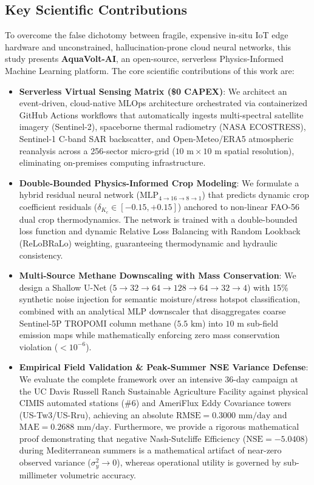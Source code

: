 \documentclass[sn-mathphys-num,Numbered]{sn-jnl}
\begin{document}
\subsection{Key Scientific Contributions}\label{sec:intro_contributions}
To overcome the false dichotomy between fragile, expensive in-situ IoT edge hardware and unconstrained, hallucination-prone cloud neural networks, this study presents \textbf{AquaVolt-AI}, an open-source, serverless Physics-Informed Machine Learning platform. The core scientific contributions of this work are:

\begin{itemize}
    \item \textbf{Serverless Virtual Sensing Matrix (\$0 CAPEX)}: We architect an event-driven, cloud-native MLOps architecture orchestrated via containerized GitHub Actions workflows that automatically ingests multi-spectral satellite imagery (Sentinel-2), spaceborne thermal radiometry (NASA ECOSTRESS), Sentinel-1 C-band SAR backscatter, and Open-Meteo/ERA5 atmospheric reanalysis across a 256-sector micro-grid ($10\text{ m} \times 10\text{ m}$ spatial resolution), eliminating on-premises computing infrastructure.
    \item \textbf{Double-Bounded Physics-Informed Crop Modeling}: We formulate a hybrid residual neural network ($\text{MLP}_{4 \to 16 \to 8 \to 1}$) that predicts dynamic crop coefficient residuals ($\delta_{K_c} \in [-0.15, +0.15]$) anchored to non-linear FAO-56 dual crop thermodynamics. The network is trained with a double-bounded loss function and dynamic Relative Loss Balancing with Random Lookback (ReLoBRaLo) weighting, guaranteeing thermodynamic and hydraulic consistency.
    \item \textbf{Multi-Source Methane Downscaling with Mass Conservation}: We design a Shallow U-Net ($5 \to 32 \to 64 \to 128 \to 64 \to 32 \to 4$) with 15\% synthetic noise injection for semantic moisture/stress hotspot classification, combined with an analytical MLP downscaler that disaggregates coarse Sentinel-5P TROPOMI column methane ($5.5\text{ km}$) into $10\text{ m}$ sub-field emission maps while mathematically enforcing zero mass conservation violation ($<10^{-6}$).
    \item \textbf{Empirical Field Validation \& Peak-Summer NSE Variance Defense}: We evaluate the complete framework over an intensive 36-day campaign at the UC Davis Russell Ranch Sustainable Agriculture Facility against physical CIMIS automated stations (\#6) and AmeriFlux Eddy Covariance towers (US-Tw3/US-Rru), achieving an absolute $\mathrm{RMSE} = 0.3000\text{ mm/day}$ and $\mathrm{MAE} = 0.2688\text{ mm/day}$. Furthermore, we provide a rigorous mathematical proof demonstrating that negative Nash-Sutcliffe Efficiency ($\text{NSE} = -5.0408$) during Mediterranean summers is a mathematical artifact of near-zero observed variance ($\sigma_y^2 \to 0$), whereas operational utility is governed by sub-millimeter volumetric accuracy.

\end{itemize}
\end{document}
